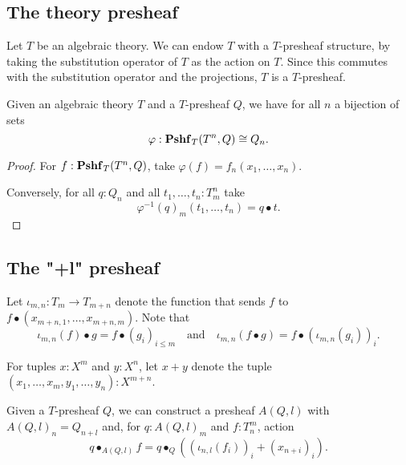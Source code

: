 \subsection{The theory presheaf}
\begin{example}
  Let $ T $ be an algebraic theory. We can endow $ T $ with a $ T $-presheaf structure, by taking the substitution operator of $ T $ as the action on $ T $. Since this commutes with the substitution operator and the projections, $ T $ is a $ T $-presheaf.
\end{example}

\begin{lemma}
  Given an algebraic theory $ T $ and a $ T $-presheaf $ Q $, we have for all $ n $ a bijection of sets
  \[ \varphi: \mathbf{Pshf}_{T}(T^n, Q) \cong Q_n. \]
\end{lemma}
\begin{proof}
  For $ f: \mathbf{Pshf}_{T}(T^n, Q) $, take $ \varphi(f) = f_n(x_1, \dots, x_n) $.

  Conversely, for all $ q: Q_n $ and all $ t_1, \dots, t_n: T_m^n $ take
  \[ \varphi^{-1}(q)_m(t_1, \dots, t_n) = q \bullet t. \]
\end{proof}

\subsection{The "+l" presheaf}

Let $ \iota_{m, n} : T_m \to T_{m + n} $ denote the function that sends $ f $ to $ f \bullet (x_{m + n, 1}, \dots, x_{m + n, m}) $. Note that
\[ \iota_{m, n}(f) \bullet g = f \bullet (g_i)_{i \leq m} \quad \text{and} \quad \iota_{m, n}(f \bullet g) = f \bullet (\iota_{m, n}(g_i))_i. \]

For tuples $ x : X^m $ and $ y: X^n $, let $ x + y $ denote the tuple $ (x_1, \dots, x_m, y_1, \dots, y_n) : X^{m + n} $.

\begin{example}
  Given a $ T $-presheaf $ Q $, we can construct a presheaf $ A(Q, l) $ with $ A(Q, l)_n = Q_{n + l} $ and, for $ q: A(Q, l)_m $ and $ f: T_n^m $, action
  \[ q \bullet_{A(Q, l)} f = q \bullet_Q ((\iota_{n, l} (f_i))_i + (x_{n + i})_i). \]
\end{example}

